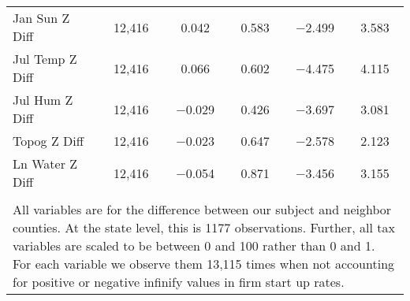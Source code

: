 \begin{table}[!htbp]
\begin{tabular}{@{\extracolsep{5pt}}lccccc}
Jan Sun Z Diff & 12,416 & 0.042 & 0.583 & $-$2.499 & 3.583 \\ 
Jul Temp Z Diff & 12,416 & 0.066 & 0.602 & $-$4.475 & 4.115 \\ 
Jul Hum Z Diff & 12,416 & $-$0.029 & 0.426 & $-$3.697 & 3.081 \\ 
Topog Z Diff & 12,416 & $-$0.023 & 0.647 & $-$2.578 & 2.123 \\ 
Ln Water Z Diff & 12,416 & $-$0.054 & 0.871 & $-$3.456 & 3.155 \\ 
\hline \\[-1.8ex] 
\multicolumn{6}{l}{All variables are for the difference between our subject and neighbor counties. At the state level, this is 1177 observations. Further, all tax variables are scaled to be between 0 and 100 rather than 0 and 1. For each variable we observe them 13,115 times when not accounting for positive or negative infinify values in firm start up rates.} \\ 
\end{tabular} 
\end{table} 
